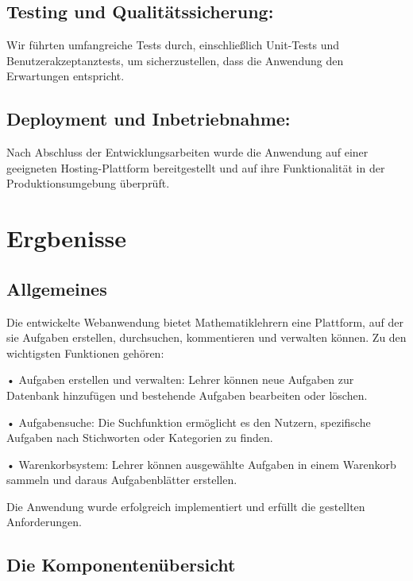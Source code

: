 \documentclass[12pt,a4paper]{scrartcl} %
\begin{document}
\subsection{Testing und Qualitätssicherung: }
Wir führten umfangreiche Tests durch, einschließlich Unit-Tests und Benutzerakzeptanztests, um sicherzustellen, dass die Anwendung den Erwartungen entspricht.


\subsection{Deployment und Inbetriebnahme: }
Nach Abschluss der Entwicklungsarbeiten wurde die Anwendung auf einer geeigneten Hosting-Plattform bereitgestellt und auf ihre Funktionalität in der Produktionsumgebung überprüft.


\section{Ergbenisse}
\subsection{Allgemeines}

Die entwickelte Webanwendung bietet Mathematiklehrern eine Plattform, auf der sie Aufgaben erstellen, durchsuchen, kommentieren und verwalten können. Zu den wichtigsten Funktionen gehören:

•	Aufgaben erstellen und verwalten: Lehrer können neue Aufgaben zur Datenbank hinzufügen und bestehende Aufgaben bearbeiten oder löschen.

•	Aufgabensuche: Die Suchfunktion ermöglicht es den Nutzern, spezifische Aufgaben nach Stichworten oder Kategorien zu finden.

•	Warenkorbsystem: Lehrer können ausgewählte Aufgaben in einem Warenkorb sammeln und daraus Aufgabenblätter erstellen.

Die Anwendung wurde erfolgreich implementiert und erfüllt die gestellten Anforderungen.

\subsection{Die Komponentenübersicht}
\end{document}
